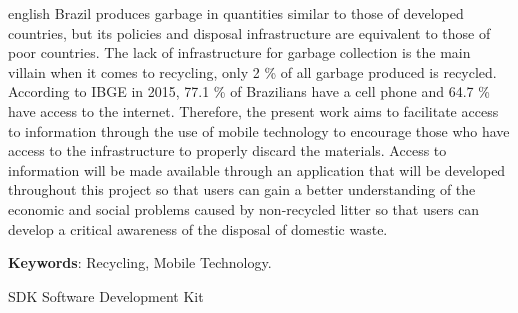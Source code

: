 \documentclass[
	12pt,				%
	openright,			%
	twoside,			%
	a4paper,			%
	english,			%
	french,				%
	spanish,			%
	brazil				%
	]{abntex2}
\begin{document}
\begin{resumo}[Abstract]
 \begin{otherlanguage*}{english}
   Brazil produces garbage in quantities similar to those of developed countries, but its policies and disposal infrastructure are equivalent to those of poor countries. The lack of infrastructure for garbage collection is the main villain when it comes to recycling, only 2 \% of all garbage produced is recycled.
According to IBGE in 2015, 77.1 \% of Brazilians have a cell phone and 64.7 \% have access to the internet. Therefore, the present work aims to facilitate access to information through the use of mobile technology to encourage those who have access to the infrastructure to properly discard the materials. Access to information will be made available through an application that will be developed throughout this project so that users can gain a better understanding of the economic and social problems caused by non-recycled litter so that users can develop a critical awareness of the disposal of domestic waste.

   \vspace{\onelineskip}
 
   \noindent 
   \textbf{Keywords}: Recycling, Mobile Technology.
 \end{otherlanguage*}
\end{resumo}



\listoffigures*
\cleardoublepage

\listoftables*
\cleardoublepage

\begin{siglas}
  \item[SDK] Software Development Kit  
\end{siglas}



\end{document}
